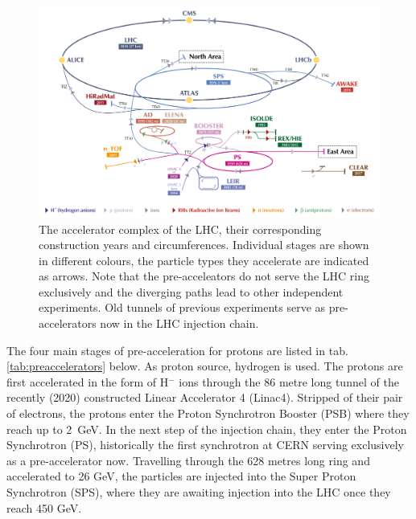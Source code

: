 \begin{figure}[h!]
	\centering
	\includegraphics[width=0.8\linewidth]{figures/theoryexperiment/CCC-v2019-final-white_cut}
	\caption{The accelerator complex of the LHC, their corresponding construction years and circumferences. Individual stages are shown in different colours, the particle types they accelerate are indicated as arrows. Note that the pre-acceleators do not serve the LHC ring exclusively and the diverging paths lead to other independent experiments. Old tunnels of previous experiments serve as pre-accelerators now in the LHC injection chain. \cite{Mobs:2684277}}
	\label{fig:lhcstructure}
\end{figure}

The four main stages of pre-acceleration for protons are listed in tab. \ref{tab:preaccelerators} below. As proton source, hydrogen is used. The protons are first accelerated in the form of H$^-$ ions through the 86 metre long tunnel of the recently (2020) constructed Linear Accelerator 4 (Linac4). Stripped of their pair of electrons, the protons enter the Proton Synchrotron Booster (PSB) where they reach up to \SI{2}{\giga\electronvolt}. In the next step of the injection chain, they enter the Proton Synchrotron (PS), historically the first synchrotron at CERN serving exclusively as a pre-accelerator now. Travelling through the 628 metres long ring and accelerated to 26 GeV, the particles are injected into the Super Proton Synchrotron (SPS), where they are awaiting injection into the LHC once they reach 450 GeV.


